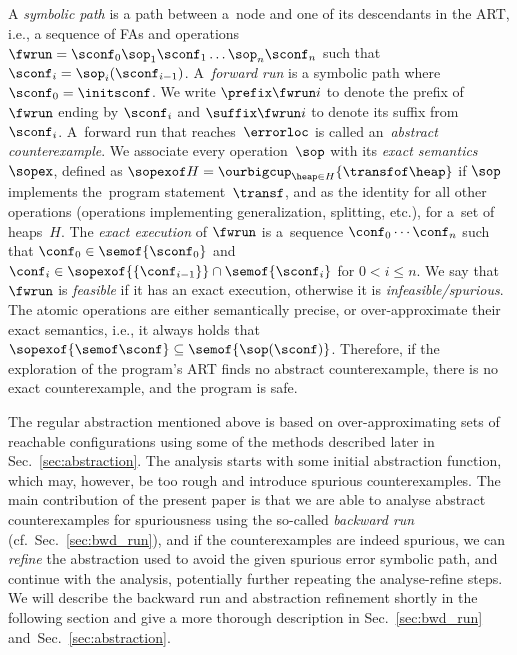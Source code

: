 {A \emph{symbolic path} is a path between a~node and one of its
descendants in the ART, i.e., a sequence of FAs and operations
$\fwrun = \sconf_0 \sop_1 \sconf_1 \ldots \sop_n \sconf_n$
such that $\sconf_i = \sop_i(\sconf_{i-1})$.
A~\emph{forward run} is a symbolic path where $\sconf_0 = \initsconf$.
We write $\prefix \fwrun i$ to denote the prefix of~$\fwrun$ ending by $\sconf_i$ and 
$\suffix \fwrun i$ to denote its suffix from~$\sconf_i$. 
%
A~forward run that reaches~$\errorloc$ is called an~\emph{abstract
counterexample}.
We associate every operation~$\sop$ with its \emph{exact semantics} $\sopex$,
defined as $\sopexof H = \ourbigcup_{\heap \in H}\{\transfof \heap\}$
if $\sop$ implements the~program statement~$\transf$,
and as the identity for all other operations (operations implementing
generalization, splitting, etc.), for a~set of heaps~$H$.
%
The \emph{exact execution} of $\fwrun$ is a~sequence $\conf_0\cdots\conf_n$
such that 
$\conf_0\in \semof{\sconf_0}$ and    
$\conf_i\in\sopexof{\{\conf_{i-1}\}}\cap\semof{\sconf_i}$ for $0 < i\leq n$.
%
We say that $\fwrun$ is \emph{feasible} if it has an exact execution, 
otherwise it is \emph{infeasible/spurious}.
The atomic operations are either semantically precise, or over-approximate
their exact semantics, i.e.,
it always holds that $\sopexof{\semof \sconf} \subseteq \semof{\sop(\sconf)}$.
Therefore,
if the exploration of the program's ART finds no abstract counterexample, there
is no exact counterexample, and
the program is safe.



The regular abstraction mentioned above is based on over-approximating sets
of reachable configurations using some of the methods described later in
Sec.~\ref{sec:abstraction}.
The analysis starts with some initial abstraction function, which may, however,
be too rough and introduce spurious counterexamples.
The main contribution of the present paper is that we are able to analyse
abstract counterexamples for spuriousness using the so-called \emph{backward run}
(cf.~Sec.~\ref{sec:bwd_run}), and if the counterexamples are indeed
spurious, we can \emph{refine} the abstraction used to avoid the given spurious error
symbolic path, and continue with the analysis,
potentially further repeating the analyse-refine steps.
We will describe the backward run and abstraction refinement shortly in the
following section and give a more thorough description in
Sec.~\ref{sec:bwd_run} and~Sec.~\ref{sec:abstraction}.

}

